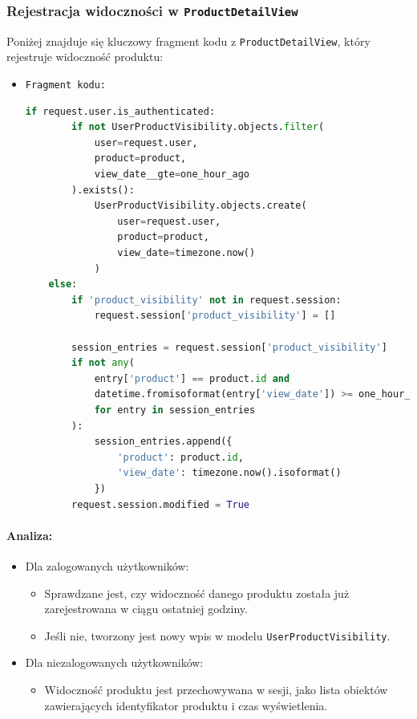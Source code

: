 \documentclass[12pt,a4paper,oneside]{article}
\theoremstyle{definition}
\numberwithin{equation}{section}
\begin{document}
\subsubsection{Rejestracja widoczności w \texttt{ProductDetailView}}
Poniżej znajduje się kluczowy fragment kodu z \texttt{ProductDetailView}, który rejestruje widoczność produktu:
\begin{itemize}
    \item \texttt{Fragment kodu:}
        \begin{lstlisting}[language=Python, caption={Fragment \texttt{ProductDetailView}}]
    if request.user.is_authenticated:
        if not UserProductVisibility.objects.filter(
            user=request.user, 
            product=product, 
            view_date__gte=one_hour_ago
        ).exists():
            UserProductVisibility.objects.create(
                user=request.user, 
                product=product, 
                view_date=timezone.now()
            )
    else:
        if 'product_visibility' not in request.session:
            request.session['product_visibility'] = []
    
        session_entries = request.session['product_visibility']
        if not any(
            entry['product'] == product.id and 
            datetime.fromisoformat(entry['view_date']) >= one_hour_ago
            for entry in session_entries
        ):
            session_entries.append({
                'product': product.id,
                'view_date': timezone.now().isoformat()
            })
        request.session.modified = True
        \end{lstlisting}
\end{itemize}


\paragraph{Analiza:}
    \begin{itemize}
        \item Dla zalogowanych użytkowników:
        \begin{itemize}
            \item Sprawdzane jest, czy widoczność danego produktu została już zarejestrowana w ciągu ostatniej godziny.
            \item Jeśli nie, tworzony jest nowy wpis w modelu \texttt{UserProductVisibility}.
        \end{itemize}
        \item Dla niezalogowanych użytkowników:
        \begin{itemize}
            \item Widoczność produktu jest przechowywana w sesji, jako lista obiektów zawierających identyfikator produktu i czas wyświetlenia.
        \end{itemize}
    \end{itemize}
\end{document}
